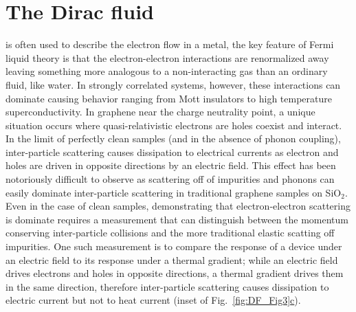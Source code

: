 \chapter{The Dirac fluid}
\label{ch:the_Dirac_fluid}

 is often used to describe the electron flow in a metal, the key feature of Fermi liquid theory is that the electron-electron interactions are renormalized away leaving something more analogous to a non-interacting gas than an ordinary fluid, like water. In strongly correlated systems, however, these interactions can dominate causing behavior ranging from Mott insulators to high temperature superconductivity. In graphene near the charge neutrality point, a unique situation occurs where quasi-relativistic electrons are holes coexist and interact. In the limit of perfectly clean samples (and in the absence of phonon coupling), inter-particle scattering causes dissipation to electrical currents as electron and holes are driven in opposite directions by an electric field. This effect has been notoriously difficult to observe as scattering off of impurities and phonons can easily dominate inter-particle scattering in traditional graphene samples on SiO$_2$. Even in the case of clean samples, demonstrating that electron-electron scattering is dominate requires a measurement that can distinguish between the momentum conserving inter-particle collisions and the more traditional elastic scatting off impurities. One such measurement is to compare the response of a device under an electric field to its response under a thermal gradient; while an electric field drives electrons and holes in opposite directions, a thermal gradient drives them in the same direction, therefore inter-particle scattering causes dissipation to electric current but not to heat current (inset of Fig.~\hyperref[fig:DF_Fig3]{\ref*{fig:DF_Fig3}c}).

